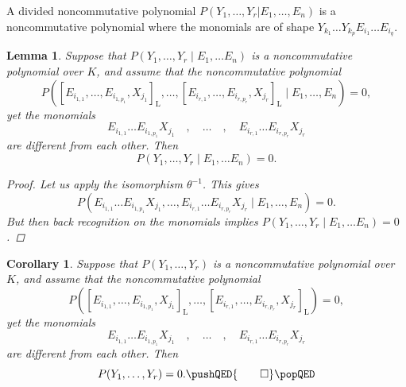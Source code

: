 \documentclass[11pt,a4paper]{amsart}
\newcommand{\plabel}[1]{ \label{#1}}
\newcommand{\plabel}[1]{ \label{#1}\rlap{\smash{${}^{^{[#1]}}$}}}
\newcommand{\plabel}[1]{ \label{#1}}
\theoremstyle{definition}
\theoremstyle{plain}
\newtheorem{lemma}[point]{Lemma}
\newtheorem{cor}[point]{Corollary}
\newcommand{\eqed}{
\pushQED{\qed}
\qedhere
\popQED
}
\begin{document}
A  divided noncommutative polynomial $P(Y_1,\ldots,Y_r| E_1,\ldots, E_n)$ is
 a noncommutative polynomial   where the monomials are of shape $Y_{k_1}\ldots Y_{k_p} E_{i_1}\ldots E_{i_q}$.
\begin{lemma}\plabel{lem:rec}
Suppose that $P(Y_1,\ldots,Y_r\mid E_1,\ldots E_n)$ is a noncommutative polynomial over $K$,
 and assume that the noncommutative polynomial
\[P([E_{i_{1,1}},\ldots ,E_{i_{1,p_1}},X_{j_1}]_{\mathrm L},\ldots,  [E_{i_{r,1}},\ldots ,E_{i_{r,p_r}},X_{j_r}]_\mathrm L
 \mid E_1,\ldots, E_n   )=0,\]
 yet the monomials
\[E_{i_{1,1}}\ldots E_{i_{1,p_1}}X_{j_1}\quad,\quad\ldots\quad,\quad E_{i_{r,1}}\ldots E_{i_{r,p_r}}X_{j_r}\]
 are different from each other.
Then
\[P(Y_1,\ldots,Y_r\mid E_1,\ldots E_n)=0.\]
\begin{proof}
Let us apply the isomorphism $\theta^{-1}$.
This gives
\[P(E_{i_{1,1}}\ldots E_{i_{1,p_1}}X_{j_1},\ldots,  E_{i_{r,1}}\ldots E_{i_{r,p_r}}X_{j_r} \mid E_1,\ldots, E_n   )=0.\]
But then back recognition on the monomials implies $P(Y_1,\ldots,Y_r\mid E_1,\ldots E_n)=0$.
\end{proof}
\end{lemma}
\begin{cor}\plabel{cor:rec}
Suppose that $P(Y_1,\ldots,Y_r)$ is a noncommutative polynomial over $K$,
 and assume that the noncommutative polynomial
\[P([E_{i_{1,1}},\ldots ,E_{i_{1,p_1}},X_{j_1}]_{\mathrm L},\ldots,  [E_{i_{r,1}},\ldots ,E_{i_{r,p_r}},X_{j_r}]_\mathrm L   )=0,\]
 yet the monomials
\[E_{i_{1,1}}\ldots E_{i_{1,p_1}}X_{j_1}\quad,\quad\ldots\quad,\quad E_{i_{r,1}}\ldots E_{i_{r,p_r}}X_{j_r}\]
 are different from each other.
Then
\[P(Y_1,\ldots,Y_r)=0.\eqed\]
\end{cor}
\end{document}
